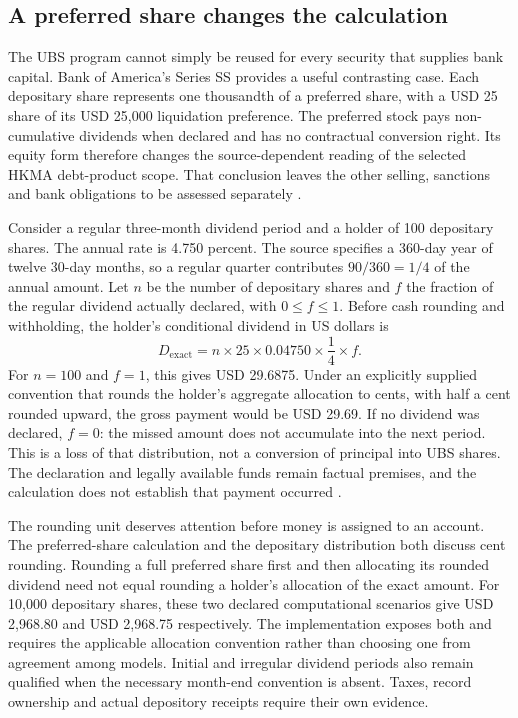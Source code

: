 \subsection{A preferred share changes the calculation}
\label{sec:preferred-evidence}

The UBS program cannot simply be reused for every security that supplies bank
capital. Bank of America's Series SS provides a useful contrasting case.
Each depositary share represents one thousandth of a preferred share, with a
USD 25 share of its USD 25,000 liquidation preference. The preferred stock
pays non-cumulative dividends when declared and has no contractual conversion
right. Its equity form therefore changes the source-dependent reading of the
selected HKMA debt-product scope. That conclusion leaves the other selling,
sanctions and bank obligations to be assessed separately
\citep[pp.~S-16--S-17, S-22, S-27]{bofass2022}.

Consider a regular three-month dividend period and a holder of 100 depositary
shares. The annual rate is 4.750 percent. The source specifies a 360-day year
of twelve 30-day months, so a regular quarter contributes $90/360=1/4$ of the
annual amount. Let $n$ be the number of depositary shares and $f$ the fraction
of the regular dividend actually declared, with $0\leq f\leq1$. Before cash
rounding and withholding, the holder's conditional dividend in US dollars is
\begin{equation}
  D_{\mathrm{exact}}=n\times25\times0.04750\times\frac14\times f.
  \label{eq:ss-regular-dividend}
\end{equation}
For $n=100$ and $f=1$, this gives USD 29.6875. Under an explicitly supplied
convention that rounds the holder's aggregate allocation to cents, with half
a cent rounded upward, the gross payment would be USD 29.69. If no dividend
was declared, $f=0$: the missed amount does not accumulate into the next
period. This is a loss of that distribution, not a conversion of principal
into UBS shares. The declaration and legally available funds remain factual
premises, and the calculation does not establish that payment occurred
\citep[pp.~S-17, S-27]{bofass2022}.

The rounding unit deserves attention before money is assigned to an account.
The preferred-share calculation and the depositary distribution both discuss
cent rounding. Rounding a full preferred share first and then allocating its
rounded dividend need not equal rounding a holder's allocation of the exact
amount. For 10,000 depositary shares, these two declared computational scenarios
give USD 2,968.80 and USD 2,968.75 respectively. The implementation exposes both
and requires the applicable allocation convention rather than choosing one
from agreement among models. Initial and irregular dividend periods also
remain qualified when the necessary month-end convention is absent. Taxes,
record ownership and actual depository receipts require their own evidence.

